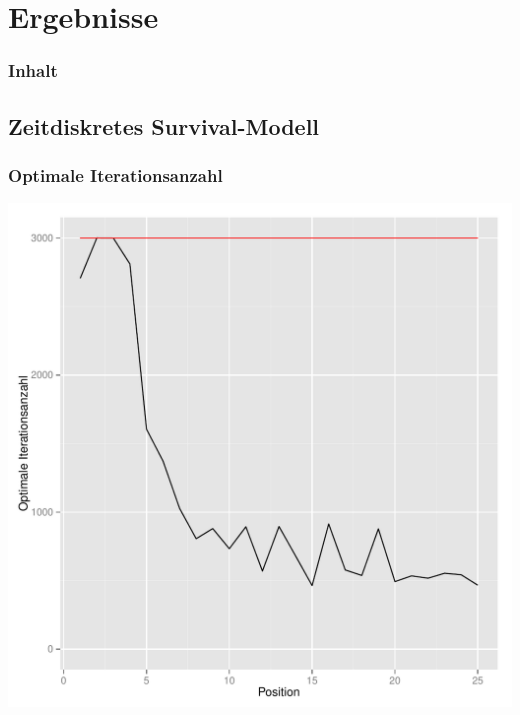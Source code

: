 \section{Ergebnisse}

\begin{frame}\frametitle{Inhalt}
\end{frame}

\subsection{Zeitdiskretes Survival-Modell}

\begin{frame}\frametitle{Optimale Iterationsanzahl}
	\centering\includegraphics[scale=0.3]{bestIter.pdf}
\end{frame}

